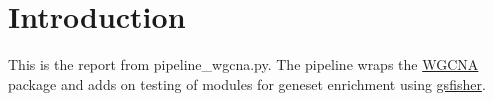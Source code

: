 \section{Introduction}

This is the report from pipeline\_wgcna.py. The pipeline wraps the \href{https://horvath.genetics.ucla.edu/html/CoexpressionNetwork/Rpackages/WGCNA/}{WGCNA} package and adds on testing of modules for geneset enrichment using \href{https://github.com/sansomlab/gsfisher}{gsfisher}.

\clearpage